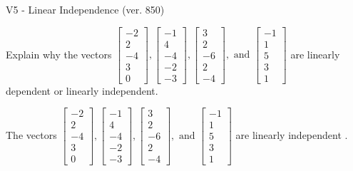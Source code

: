 \begin{exercise}
  \begin{exerciseTitle}V5 - Linear Independence (ver. 850)\end{exerciseTitle}
  \begin{exerciseStatement}
    Explain why the vectors \(\left[\begin{array}{r}
-2 \\
2 \\
-4 \\
3 \\
0
\end{array}\right] , \left[\begin{array}{r}
-1 \\
4 \\
-4 \\
-2 \\
-3
\end{array}\right] , \left[\begin{array}{r}
3 \\
2 \\
-6 \\
2 \\
-4
\end{array}\right] , \text{ and } \left[\begin{array}{r}
-1 \\
1 \\
5 \\
3 \\
1
\end{array}\right]\) are linearly dependent or linearly independent.	


  \end{exerciseStatement}
  \begin{exerciseAnswer}
   The vectors \(\left[\begin{array}{r}
-2 \\
2 \\
-4 \\
3 \\
0
\end{array}\right] , \left[\begin{array}{r}
-1 \\
4 \\
-4 \\
-2 \\
-3
\end{array}\right] , \left[\begin{array}{r}
3 \\
2 \\
-6 \\
2 \\
-4
\end{array}\right] , \text{ and } \left[\begin{array}{r}
-1 \\
1 \\
5 \\
3 \\
1
\end{array}\right]\) are 
  	 linearly independent  .
  


  \end{exerciseAnswer}
\end{exercise}
